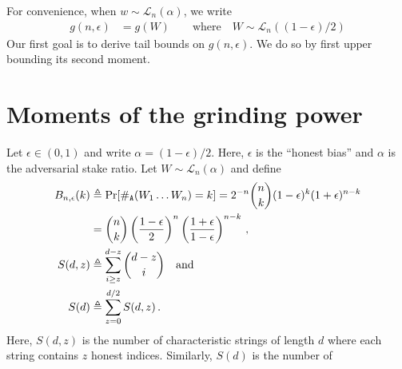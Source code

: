 For convenience, when $w \sim \mathcal{L}_n(\alpha)$, we write
\begin{align}
  g(n,\epsilon) &= g(W) \qquad \text{where} \quad W \sim \mathcal{L}_n((1-\epsilon)/2) \label{eq:praos-gneps}
\end{align}
\noindent 
Our first goal is to derive tail bounds on $g(n,\epsilon)$. 
We do so by first upper bounding its second moment.




\section{Moments of the grinding power}\label{sec:praos-gp-mgf}
Let $\epsilon \in (0, 1)$ and write $\alpha = (1 - \epsilon)/2$. 
Here, $\epsilon$ is the ``honest bias'' and $\alpha$ is the adversarial stake ratio.
Let $W \sim \mathcal{L}_n(\alpha)$ and 
define 
\begin{align}
    B_{n, \epsilon}(k) 
    &\triangleq \Pr[ \#_{\mathtt{A}}(W_1 \ldots W_n) = k ]  
    = 2^{-n}\binom{n}{k} (1-\epsilon)^k (1 + \epsilon)^{n-k} \nonumber\\
    &=  \binom{n}{k} 
        \left(\frac{1-\epsilon}{2}\right)^n 
        \left(\frac{1 + \epsilon}{1-\epsilon} \right)^{n-k} 
        \,, \label{eq:suffix-prob-binomial}\\
  S(d, z) 
    &\triangleq \sum_{i \geq z}^{d-z}{ \binom{d-z}{i} } \label{eq:S_d_z}
    \quad\text{and}\quad \\
  S(d) &\triangleq \sum_{z = 0}^{d/2} S(d,z) \label{eq:S_d}
  \,.
\end{align}
Here, $S(d,z)$ is the number of characteristic strings 
of length $d$ where each string contains $z$ honest indices. 
Similarly, $S(d)$ is the number of 



